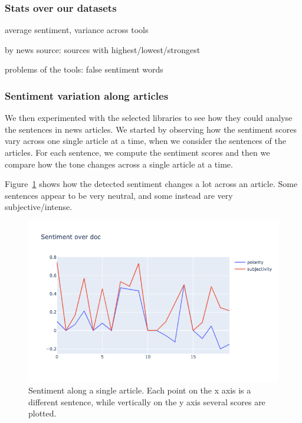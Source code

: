 \subsubsection{\statusred Stats over our datasets}


average sentiment, variance across tools

by news source: sources with highest/lowest/strongest

problems of the tools: false sentiment words


\subsubsection{\statusorange Sentiment variation along articles}

We then experimented with the selected libraries to see how they could analyse the sentences in news articles. We started by observing how the sentiment scores vary across one single article at a time, when we consider the sentences of the articles. For each sentence, we compute the sentiment scores and then we compare how the tone changes across a single article at a time.

Figure~\ref{fig:sentiment_across_one_article} shows how the detected sentiment changes a lot across an article.
Some sentences appear to be very neutral, and some instead are very subjective/intense.

\begin{figure}[!htbp]
    \centering
    \includegraphics[width=\linewidth]{figures/sentiment_across_article.png}
    \caption{Sentiment along a single article. Each point on the x axis is a different sentence, while vertically on the y axis several scores are plotted.}
    \label{fig:sentiment_across_one_article}
\end{figure}

